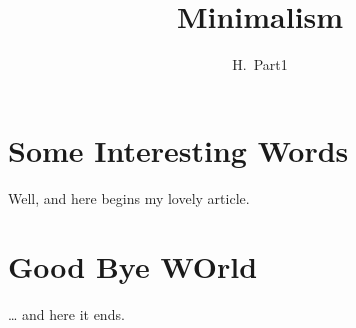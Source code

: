 \documentclass[a4paper,11pt]{article}
\author{H.~Part1}
\title{Minimalism}
\begin{document}
\maketitle
\tableofcontents
\section{Some Interesting Words}
Well, and here begins my lovely article.
\section{Good Bye WOrld}
\ldots{} and here it ends.
\end{document}
